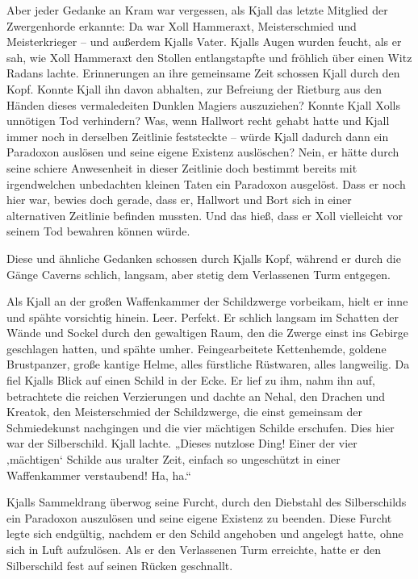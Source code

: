 Aber jeder Gedanke an Kram war vergessen, als Kjall das letzte Mitglied der Zwergenhorde erkannte: Da war Xoll Hammeraxt, Meisterschmied und Meisterkrieger – und außerdem Kjalls Vater. Kjalls Augen wurden feucht, als er sah, wie Xoll Hammeraxt den Stollen entlangstapfte und fröhlich über einen Witz Radans lachte. Erinnerungen an ihre gemeinsame Zeit schossen Kjall durch den Kopf. Konnte Kjall ihn davon abhalten, zur Befreiung der Rietburg aus den Händen dieses vermaledeiten Dunklen Magiers auszuziehen? Konnte Kjall Xolls unnötigen Tod verhindern? Was, wenn Hallwort recht gehabt hatte und Kjall immer noch in derselben Zeitlinie feststeckte – würde Kjall dadurch dann ein Paradoxon auslösen und seine eigene Existenz auslöschen? Nein, er hätte durch seine schiere Anwesenheit in dieser Zeitlinie doch bestimmt bereits mit irgendwelchen unbedachten kleinen Taten ein Paradoxon ausgelöst. Dass er noch hier war, bewies doch gerade, dass er, Hallwort und Bort sich in einer alternativen Zeitlinie befinden mussten. Und das hieß, dass er Xoll vielleicht vor seinem Tod bewahren können würde.

Diese und ähnliche Gedanken schossen durch Kjalls Kopf, während er durch die Gänge Caverns schlich, langsam, aber stetig dem Verlassenen Turm entgegen.



\trennzeichen



Als Kjall an der großen Waffenkammer der Schildzwerge vorbeikam, hielt er inne und spähte vorsichtig hinein. Leer. Perfekt. Er schlich langsam im Schatten der Wände und Sockel durch den gewaltigen Raum, den die Zwerge einst ins Gebirge geschlagen hatten, und spähte umher. Feingearbeitete Kettenhemde, goldene Brustpanzer, große kantige Helme, alles fürstliche Rüstwaren, alles langweilig. Da fiel Kjalls Blick auf einen Schild in der Ecke. Er lief zu ihm, nahm ihn auf, betrachtete die reichen Verzierungen und dachte an Nehal, den Drachen und Kreatok, den Meisterschmied der Schildzwerge, die einst gemeinsam der Schmiedekunst nachgingen und die vier mächtigen Schilde erschufen. Dies hier war der Silberschild. Kjall lachte. „Dieses nutzlose Ding! Einer der vier ‚mächtigen‘ Schilde aus uralter Zeit, einfach so ungeschützt in einer Waffenkammer verstaubend! Ha, ha.“

Kjalls Sammeldrang überwog seine Furcht, durch den Diebstahl des Silberschilds ein Paradoxon auszulösen und seine eigene Existenz zu beenden. Diese Furcht legte sich endgültig, nachdem er den Schild angehoben und angelegt hatte, ohne sich in Luft aufzulösen. Als er den Verlassenen Turm erreichte, hatte er den Silberschild fest auf seinen Rücken geschnallt.



